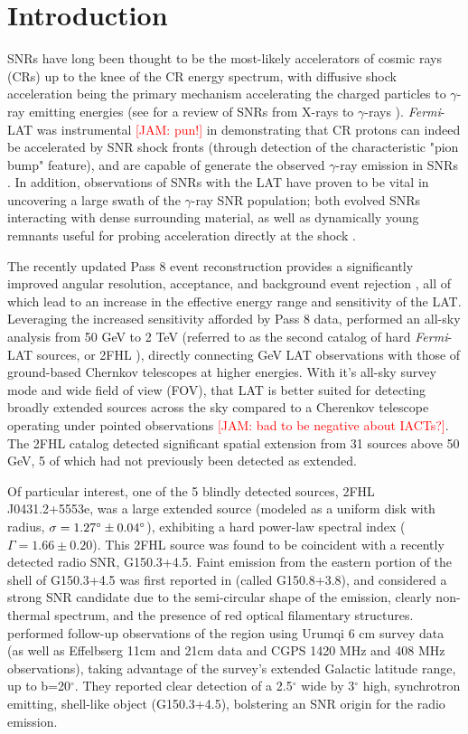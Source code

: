 \documentclass[iop]{emulateapj}
\newcommand{\kibitz}[2]{\ifnum\Comments=1\textcolor{#1}{#2}\fi}
\newcommand{\jamie}[1]{\kibitz{red}      {[JAM: #1]}}
\newcommand{\gam}{$\gamma$-ray}
\newcommand{\Fermi}{\emph{Fermi}}  %
\newcommand{\Gone}{G150.3+4.5}
\begin{document}
\section{Introduction} 
SNRs have long been thought to be the most-likely accelerators of cosmic rays (CRs) up to the knee of the CR energy spectrum, with diffusive shock acceleration being the primary mechanism accelerating the charged particles to \gam{} emitting energies (see \cite{Reynolds08} for a review of  SNRs from X-rays to \gam{}s ). \Fermi{}-LAT was instrumental \jamie{pun!} in demonstrating that CR protons can indeed be accelerated by SNR shock fronts (through detection of the characteristic "pion bump" feature), and are capable of generate the observed \gam{} emission in SNRs \citep{W44pion, Jogler16}. In addition, observations of SNRs with the LAT have proven to be vital in uncovering a large swath of the \gam{} SNR population; both evolved SNRs interacting with dense surrounding material, as well as dynamically young remnants useful for probing acceleration directly at the shock \citep{snrCat}. 

The recently updated Pass 8 event reconstruction provides a significantly improved angular resolution,  acceptance, and background event rejection \citep{atwood13b,atwood13}, all of which lead to an increase in the effective energy range and sensitivity of the LAT. Leveraging the increased sensitivity afforded by Pass 8 data, \cite{2FHL} performed an all-sky analysis from 50 GeV to 2 TeV (referred to as the second catalog of hard \Fermi{}-LAT sources, or 2FHL ), directly connecting GeV LAT observations  with those of ground-based Chernkov telescopes at higher energies. With it's all-sky survey mode and wide field of view (FOV), that LAT is better suited for detecting broadly extended sources across the sky compared to a Cherenkov telescope operating under pointed observations \jamie{bad to be negative about IACTs?}. The 2FHL catalog detected significant spatial extension from 31 sources above 50 GeV, 5 of which had not previously been detected as extended.

Of particular interest, one of the 5 blindly detected sources, 2FHL J0431.2+5553e, was a large extended source  (modeled as a uniform disk with radius, ${\rm \sigma = 1.27^\circ \pm 0.04^\circ}$), exhibiting a hard power-law spectral index ($\Gamma = 1.66 \pm 0.20$). This 2FHL source was found to be coincident with a recently detected radio SNR, \Gone{}. Faint emission from the eastern portion of the shell of \Gone{} was first reported in \cite{Gerbrandt14} (called G150.8+3.8), and considered a strong SNR candidate due to the semi-circular shape of the emission, clearly non-thermal spectrum, and the presence of red optical filamentary structures. \cite{Gao14} performed follow-up observations of the region using Urumqi 6 cm survey data (as well as Effelbserg 11cm and 21cm data and CGPS 1420 MHz and 408 MHz observations), taking advantage of the survey's extended Galactic latitude range, up to b=20$^\circ$. They reported clear detection of a 2.5$^\circ$ wide by 3$^\circ$ high, synchrotron emitting, shell-like object (\Gone{}),  bolstering an SNR origin for the radio emission.
\end{document}
